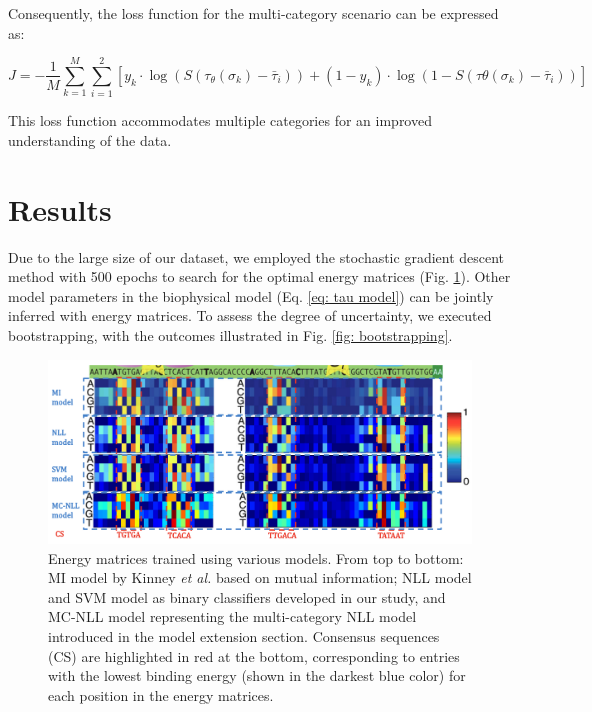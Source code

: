 \documentclass{article}
\begin{document}
Consequently, the loss function for the multi-category scenario can be expressed as:

\begin{equation}
J = -\frac{1}{M}\sum_{k=1}^M \sum_{i=1}^2 [y_k\cdot\log(S(\tau_\theta(\sigma_k)-\bar{\tau}_i))+(1-y_k)\cdot\log(1-S(\tau\theta(\sigma_k)-\bar{\tau}_i))]
\end{equation}

This loss function accommodates multiple categories for an improved understanding of the data.


\section{Results}

Due to the large size of our dataset, we employed the stochastic gradient descent method with 500 epochs to search for the optimal energy matrices (Fig. \ref{fig: energy matrices}). Other model parameters in the biophysical model (Eq. \ref{eq: tau model}) can be jointly inferred with energy matrices. To assess the degree of uncertainty, we executed bootstrapping, with the outcomes illustrated in Fig. \ref{fig: bootstrapping}.

\begin{figure}[htbp]
\centering
\includegraphics[width=1\linewidth]{figures/230908_energy_matrices.png}
\caption{Energy matrices trained using various models. From top to bottom: MI model by Kinney \textit{et al.} \cite{Kinney2010PNAS} based on mutual information; NLL model and SVM model as binary classifiers developed in our study, and MC-NLL model representing the multi-category NLL model introduced in the model extension section. Consensus sequences (CS) are highlighted in red at the bottom, corresponding to entries with the lowest binding energy (shown in the darkest blue color) for each position in the energy matrices.}
\label{fig: energy matrices}
\end{figure}
\end{document}
